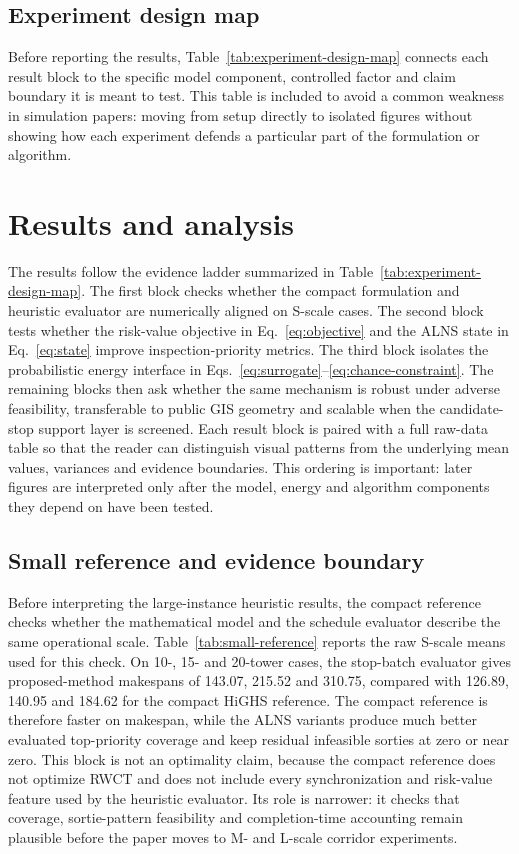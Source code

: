 \subsection{Experiment design map}

Before reporting the results, Table~\ref{tab:experiment-design-map} connects each result block to the specific model component, controlled factor and claim boundary it is meant to test. This table is included to avoid a common weakness in simulation papers: moving from setup directly to isolated figures without showing how each experiment defends a particular part of the formulation or algorithm.



\section{Results and analysis}
\label{sec:results}

The results follow the evidence ladder summarized in Table~\ref{tab:experiment-design-map}. The first block checks whether the compact formulation and heuristic evaluator are numerically aligned on S-scale cases. The second block tests whether the risk-value objective in Eq.~\eqref{eq:objective} and the ALNS state in Eq.~\eqref{eq:state} improve inspection-priority metrics. The third block isolates the probabilistic energy interface in Eqs.~\eqref{eq:surrogate}--\eqref{eq:chance-constraint}. The remaining blocks then ask whether the same mechanism is robust under adverse feasibility, transferable to public GIS geometry and scalable when the candidate-stop support layer is screened. Each result block is paired with a full raw-data table so that the reader can distinguish visual patterns from the underlying mean values, variances and evidence boundaries. This ordering is important: later figures are interpreted only after the model, energy and algorithm components they depend on have been tested.

\subsection{Small reference and evidence boundary}

Before interpreting the large-instance heuristic results, the compact reference checks whether the mathematical model and the schedule evaluator describe the same operational scale. Table~\ref{tab:small-reference} reports the raw S-scale means used for this check. On 10-, 15- and 20-tower cases, the stop-batch evaluator gives proposed-method makespans of 143.07, 215.52 and 310.75, compared with 126.89, 140.95 and 184.62 for the compact HiGHS reference. The compact reference is therefore faster on makespan, while the ALNS variants produce much better evaluated top-priority coverage and keep residual infeasible sorties at zero or near zero. This block is not an optimality claim, because the compact reference does not optimize RWCT and does not include every synchronization and risk-value feature used by the heuristic evaluator. Its role is narrower: it checks that coverage, sortie-pattern feasibility and completion-time accounting remain plausible before the paper moves to M- and L-scale corridor experiments.

